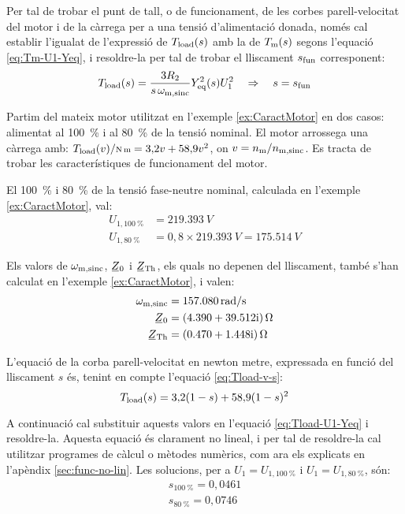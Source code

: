 Per tal de trobar el punt de tall, o de funcionament, de les corbes parell-velocitat del motor i de la càrrega per a una tensió d'alimentació donada, només cal establir l'igualat de l'expressió de $T_\mathrm{load}(s)$ amb la de $T_\mathrm{m}(s)$ segons l'equació \eqref{eq:Tm-U1-Yeq}, i resoldre-la per tal de trobar el lliscament $s_\mathrm{fun}$ corresponent:
\begin{equation}\label{eq:Tload-U1-Yeq}
	T_\mathrm{load}(s) = \frac{3 R_2}{s\,\omega_\mathrm{m,sinc}} Y_\mathrm{eq}^2(s) U_1^2 \quad\Rightarrow \quad s=s_\mathrm{fun}
\end{equation}


\begin{exemple}\label{ex:MotTensRedSolEx}
	\addcontentsxms{\MotTensRedSolEx}
	Partim del mateix motor utilitzat en l'exemple \vref{ex:CaractMotor} en dos casos: alimentat al \qty{100}{\%} i al \qty{80}{\%} de la tensió nominal. El motor arrossega una càrrega amb: $T\ped{load}(v) /{\scriptstyle \unit{N.m}} = 3{,}2 v + 58{,}9 v^2$, on $v = n_\mathrm{m}/n_\mathrm{m,sinc}$. Es tracta de trobar les característiques de funcionament del motor.
	
	El \qty{100}{\%} i \qty{80}{\%} de la tensió fase-neutre nominal, calculada  en l'exemple \ref{ex:CaractMotor}, val:
	\begin{align*}
		U_{1,\qty{100}{\%}} &= \qty{219,393}{V} \\
		U_{1,\qty{80}{\%}} &= 0{,}8\times\qty{219,393}{V} = \qty{175,514}{V}
	\end{align*}

	Els valors de $\omega_\mathrm{m,sinc}$, $\cmplx{Z}_0$ i  $\cmplx{Z}\ped{Th}$, els quals no depenen del lliscament, també s'han calculat en  l'exemple \ref{ex:CaractMotor}, i valen:
	\vspace{-2mm}
	\begin{align*}
		\omega\ped{m,sinc} &=  \qty{157,080}{rad/s} \\
		\cmplx{Z}_0 &=  \complexqty{4,390+j39,512}{\ohm} \\
		\cmplx{Z}\ped{Th} &= \complexqty{0,470+j1,448}{\ohm} 
	\end{align*}
	
	L'equació de la corba parell-velocitat en newton metre, expressada en funció del lliscament $s$ és, tenint en compte l'equació \eqref{eq:Tload-v-s}:
	\[
		T_\mathrm{load}(s) = 3{,}2 (1-s) + 58{,}9 (1-s)^2
	\]

	A continuació cal substituir aquests valors en l'equació \eqref{eq:Tload-U1-Yeq} i resoldre-la. Aquesta equació és clarament no lineal, i per tal de resoldre-la cal utilitzar programes de càlcul o mètodes numèrics, com ara els explicats en l'apèndix \ref{sec:func-no-lin}. Les solucions, per a $U_1=U_{1,\qty{100}{\%}}$ i $U_1=U_{1,\qty{80}{\%}}$, són:
	\begin{align*}
		s_{\qty{100}{\%}} = 0{,}0461 \\
	 	s_{\qty{80}{\%}}= 0{,}0746
	\end{align*}	
	

\end{exemple}
